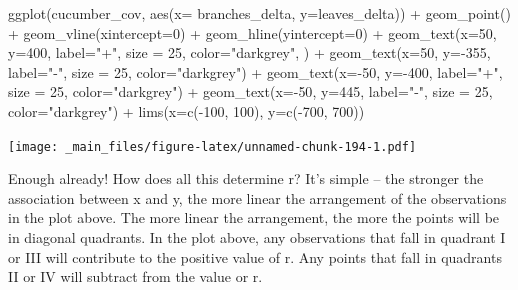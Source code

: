 \documentclass[
]{book}
\newenvironment{Shaded}{\begin{snugshade}}{\end{snugshade}}
\newcommand{\AttributeTok}[1]{\textcolor[rgb]{0.77,0.63,0.00}{#1}}
\newcommand{\DecValTok}[1]{\textcolor[rgb]{0.00,0.00,0.81}{#1}}
\newcommand{\FunctionTok}[1]{\textcolor[rgb]{0.00,0.00,0.00}{#1}}
\newcommand{\NormalTok}[1]{#1}
\newcommand{\SpecialCharTok}[1]{\textcolor[rgb]{0.00,0.00,0.00}{#1}}
\newcommand{\StringTok}[1]{\textcolor[rgb]{0.31,0.60,0.02}{#1}}
\begin{document}
\begin{Shaded}
\begin{Highlighting}[]
\FunctionTok{ggplot}\NormalTok{(cucumber\_cov, }\FunctionTok{aes}\NormalTok{(}\AttributeTok{x=}\NormalTok{ branches\_delta, }\AttributeTok{y=}\NormalTok{leaves\_delta)) }\SpecialCharTok{+}
  \FunctionTok{geom\_point}\NormalTok{() }\SpecialCharTok{+}
  \FunctionTok{geom\_vline}\NormalTok{(}\AttributeTok{xintercept=}\DecValTok{0}\NormalTok{) }\SpecialCharTok{+}
  \FunctionTok{geom\_hline}\NormalTok{(}\AttributeTok{yintercept=}\DecValTok{0}\NormalTok{) }\SpecialCharTok{+}
  \FunctionTok{geom\_text}\NormalTok{(}\AttributeTok{x=}\DecValTok{50}\NormalTok{, }\AttributeTok{y=}\DecValTok{400}\NormalTok{, }\AttributeTok{label=}\StringTok{"+"}\NormalTok{, }\AttributeTok{size =} \DecValTok{25}\NormalTok{, }\AttributeTok{color=}\StringTok{"darkgrey"}\NormalTok{, ) }\SpecialCharTok{+}
  \FunctionTok{geom\_text}\NormalTok{(}\AttributeTok{x=}\DecValTok{50}\NormalTok{, }\AttributeTok{y=}\SpecialCharTok{{-}}\DecValTok{355}\NormalTok{, }\AttributeTok{label=}\StringTok{"{-}"}\NormalTok{, }\AttributeTok{size =} \DecValTok{25}\NormalTok{, }\AttributeTok{color=}\StringTok{"darkgrey"}\NormalTok{) }\SpecialCharTok{+}
  \FunctionTok{geom\_text}\NormalTok{(}\AttributeTok{x=}\SpecialCharTok{{-}}\DecValTok{50}\NormalTok{, }\AttributeTok{y=}\SpecialCharTok{{-}}\DecValTok{400}\NormalTok{, }\AttributeTok{label=}\StringTok{"+"}\NormalTok{, }\AttributeTok{size =} \DecValTok{25}\NormalTok{, }\AttributeTok{color=}\StringTok{"darkgrey"}\NormalTok{) }\SpecialCharTok{+}
  \FunctionTok{geom\_text}\NormalTok{(}\AttributeTok{x=}\SpecialCharTok{{-}}\DecValTok{50}\NormalTok{, }\AttributeTok{y=}\DecValTok{445}\NormalTok{, }\AttributeTok{label=}\StringTok{"{-}"}\NormalTok{, }\AttributeTok{size =} \DecValTok{25}\NormalTok{, }\AttributeTok{color=}\StringTok{"darkgrey"}\NormalTok{) }\SpecialCharTok{+}
  \FunctionTok{lims}\NormalTok{(}\AttributeTok{x=}\FunctionTok{c}\NormalTok{(}\SpecialCharTok{{-}}\DecValTok{100}\NormalTok{, }\DecValTok{100}\NormalTok{), }\AttributeTok{y=}\FunctionTok{c}\NormalTok{(}\SpecialCharTok{{-}}\DecValTok{700}\NormalTok{, }\DecValTok{700}\NormalTok{))}
\end{Highlighting}
\end{Shaded}

\texttt{[image: \_main\_files/figure-latex/unnamed-chunk-194-1.pdf]}

Enough already! How does all this determine r? It's simple -- the stronger the association between x and y, the more linear the arrangement of the observations in the plot above. The more linear the arrangement, the more the points will be in diagonal quadrants. In the plot above, any observations that fall in quadrant I or III will contribute to the positive value of r. Any points that fall in quadrants II or IV will subtract from the value or r.
\end{document}
